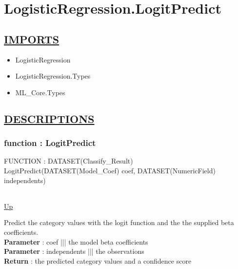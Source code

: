 \chapter*{LogisticRegression.LogitPredict}
\hypertarget{LogisticRegression.LogitPredict}{}

\section*{\underline{IMPORTS}}
\begin{itemize}
\item LogisticRegression
\item LogisticRegression.Types
\item ML\_Core.Types
\end{itemize}

\section*{\underline{DESCRIPTIONS}}
\subsection*{function : LogitPredict}
\hypertarget{ecldoc:logisticregression.logitpredict}{FUNCTION : DATASET(Classify\_Result) LogitPredict(DATASET(Model\_Coef) coef, DATASET(NumericField) independents)} \\
\hyperlink{ecldoc:}{Up} \\
\par
Predict the category values with the logit function and the the supplied beta coefficients. \\
\textbf{Parameter} : coef ||| the model beta coefficients \\
\textbf{Parameter} : independents ||| the observations \\
\textbf{Return} : the predicted category values and a confidence score \\
